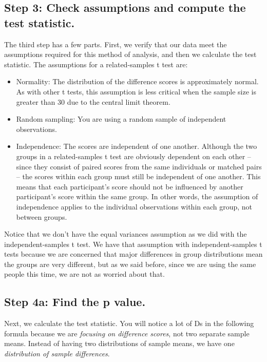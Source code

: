 \documentclass[
  letterpaper,
  DIV=11,
  numbers=noendperiod]{scrreprt}
\begin{document}
\subsection*{Step 3: Check assumptions and compute the test
statistic.\,}\label{step-3-check-assumptions-and-compute-the-test-statistic.-2}

The third step has a few parts. First, we verify that our data meet the
assumptions required for this method of analysis, and then we calculate
the test statistic. The assumptions for a related-samples t test are:

\begin{itemize}
\item
  Normality: The distribution of the difference scores is approximately
  normal. As with other t tests, this assumption is less critical when
  the sample size is greater than 30 due to the central limit theorem.
\item
  Random sampling: You are using a random sample of independent
  observations.
\item
  Independence: The scores are independent of one another. Although the
  two groups in a related-samples t test are obviously dependent on each
  other -- since they consist of paired scores from the same individuals
  or matched pairs -- the scores within each group must still be
  independent of one another. This means that each participant's score
  should not be influenced by another participant's score within the
  same group. In other words, the assumption of independence applies to
  the individual observations within each group, not between groups.
\end{itemize}

Notice that we don't have the equal variances assumption as we did with
the independent-samples t test. We have that assumption with
independent-samples t tests because we are concerned that major
differences in group distributions mean the groups are very different,
but as we said before, since we are using the same people this time, we
are not as worried about that.

\subsection*{Step 4a: Find the p
value.}\label{step-4a-find-the-p-value.-1}

Next, we calculate the test statistic. You will notice a lot of Ds in
the following formula because we are \emph{focusing on difference
scores}, not two separate sample means. Instead of having two
distributions of sample means, we have one \emph{distribution of sample
differences}.
\end{document}
